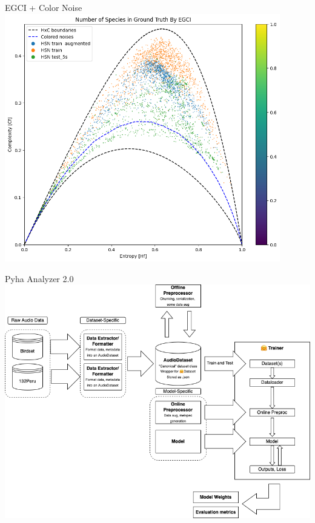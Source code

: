 \begin{frame}{EGCI + Color Noise}
    \centering
    \includegraphics[height=0.9\textheight,width=0.9\textwidth,keepaspectratio]{images/pink_noise_0.25-1_SNR.png}
\end{frame}

\begin{frame}{Pyha Analyzer 2.0}
    \centering
    \includegraphics[height=1\textheight,width=1\textwidth,keepaspectratio]{images/pyha-analyzer-2.0.png}
\end{frame}
